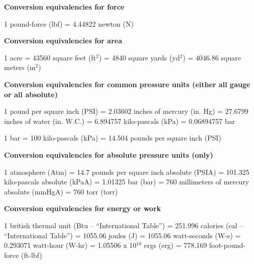 
\goodbreak 
{\bf Conversion equivalencies for force}

\vskip 5pt {\narrower \noindent \baselineskip5pt
1 pound-force (lbf) = 4.44822 newton (N)
\par} \vskip 10pt
\bigskip 
 

\goodbreak 
{\bf Conversion equivalencies for area}

\vskip 5pt {\narrower \noindent \baselineskip5pt
1 acre = 43560 square feet (ft$^{2}$) = 4840 square yards (yd$^{2}$) = 4046.86 square meters (m$^{2}$)
\par} \vskip 10pt
\bigskip 
 

\goodbreak 
{\bf Conversion equivalencies for common pressure units (either all gauge or all absolute)}

\vskip 5pt {\narrower \noindent \baselineskip5pt
1 pound per square inch (PSI) = 2.03602 inches of mercury (in. Hg) = 27.6799 inches of water (in. W.C.) = 6.894757 kilo-pascals (kPa) = 0.06894757 bar
\par} 
\medskip 
 
{\narrower \noindent \baselineskip5pt
1 bar = 100 kilo-pascals (kPa) = 14.504 pounds per square inch (PSI) 
\par} \vskip 10pt
\bigskip 


\goodbreak 
{\bf Conversion equivalencies for absolute pressure units (only)}

\vskip 5pt {\narrower \noindent \baselineskip5pt
1 atmosphere (Atm) = 14.7 pounds per square inch absolute (PSIA) = 101.325 kilo-pascals absolute (kPaA) = 1.01325 bar (bar) = 760 millimeters of mercury absolute (mmHgA) = 760 torr (torr)
\par} \vskip 10pt
\bigskip 


\goodbreak 
{\bf Conversion equivalencies for energy or work}

\vskip 5pt {\narrower \noindent \baselineskip5pt
1 british thermal unit (Btu -- ``International Table'') = 251.996 calories (cal -- ``International Table'') = 1055.06 joules (J) = 1055.06 watt-seconds (W-s) = 0.293071 watt-hour (W-hr) = 1.05506 x 10$^{10}$ ergs (erg) = 778.169 foot-pound-force (ft-lbf) 
\par} \vskip 10pt
\bigskip 
 
